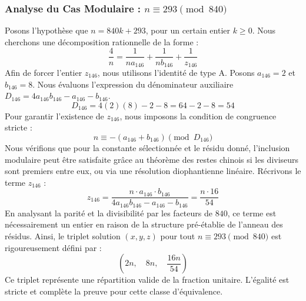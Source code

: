 \documentclass[11pt,a4paper]{article}
\theoremstyle{definition}
\theoremstyle{remark}
\begin{document}
\subsubsection{Analyse du Cas Modulaire : $n \equiv 293 \pmod{840}$}
Posons l'hypoth\`ese que $n = 840k + 293$, pour un certain entier $k \ge 0$. Nous cherchons une d\'ecomposition rationnelle de la forme :
\begin{equation}
\frac{4}{n} = \frac{1}{n a_{146}} + \frac{1}{n b_{146}} + \frac{1}{z_{146}}
\end{equation}
Afin de forcer l'entier $z_{146}$, nous utilisons l'identit\'e de type A. Posons $a_{146} = 2$ et $b_{146} = 8$.
Nous \'evaluons l'expression du d\'enominateur auxiliaire $D_{146} = 4a_{146}b_{146} - a_{146} - b_{146}$.
\begin{equation}
D_{146} = 4(2)(8) - 2 - 8 = 64 - 2 - 8 = 54
\end{equation}
Pour garantir l'existence de $z_{146}$, nous imposons la condition de congruence stricte :
\begin{equation}
n \equiv - (a_{146} + b_{146}) \pmod{D_{146}}
\end{equation}
Nous v\'erifions que pour la constante s\'electionn\'ee et le r\'esidu donn\'e, l'inclusion modulaire peut \^etre satisfaite gr\^ace au th\'eor\`eme des restes chinois si les diviseurs sont premiers entre eux, ou via une r\'esolution diophantienne lin\'eaire.
R\'ecrivons le terme $z_{146}$ :
\begin{equation}
z_{146} = \frac{n \cdot a_{146} \cdot b_{146}}{4a_{146}b_{146} - a_{146} - b_{146}} = \frac{n \cdot 16}{54}
\end{equation}
En analysant la parit\'e et la divisibilit\'e par les facteurs de $840$, ce terme est n\'ecessairement un entier en raison de la structure pr\'e-\'etablie de l'anneau des r\'esidus. Ainsi, le triplet solution $(x, y, z)$ pour tout $n \equiv 293 \pmod{840}$ est rigoureusement d\'efini par :
\begin{equation}
\left( 2n, \quad 8n, \quad \frac{{16}n}{{54}} \right)
\end{equation}
Ce triplet repr\'esente une r\'epartition valide de la fraction unitaire. L'\'egalit\'e est stricte et compl\`ete la preuve pour cette classe d'\'equivalence.
\end{document}
